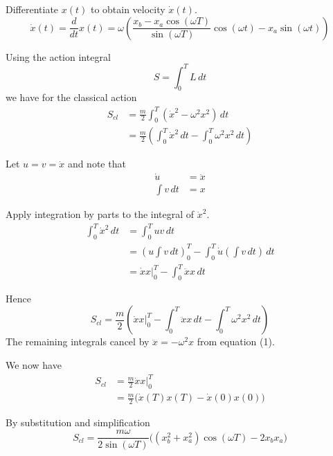 \documentclass[12pt]{article}
\begin{document}
Differentiate $x(t)$ to obtain velocity $\dot x(t)$.
\begin{equation*}
\dot x(t)=\frac{d}{dt}x(t)=
\omega\left(
\frac{x_b-x_a\cos(\omega T)}{\sin(\omega T)}\cos(\omega t)-x_a\sin(\omega t)
\right)
\tag{3}
\end{equation*}

Using the action integral
\begin{equation*}
S=\int_0^T L\,dt
\end{equation*}
we have for the classical action
\begin{align*}
S_{cl}&=\frac{m}{2}\int_0^T (\dot{x}^2-\omega^2 x^2)\,dt
\\[1ex]
&=\frac{m}{2}\left(
\int_0^T\dot{x}^2\,dt
-\int_0^T\omega^2x^2\,dt\right)
\end{align*}

Let $u=v=\dot x$ and note that
\begin{align*}
\dot u&=\ddot x
\\[1ex]
\int v\,dt&=x
\end{align*}

Apply integration by parts to the integral of $\dot x^2$.
\begin{align*}
\int_0^T \dot x^2\,dt
&=\int_0^T uv\,dt
\\[1ex]
&=\left(u\int v\,dt\right)_0^T
-\int_0^T\dot u\left(\int v\,dt\right)\,dt
\\[1ex]
&=\dot xx\bigg|_0^T-\int_0^T \ddot xx\,dt
\end{align*}

Hence
\begin{equation*}
S_{cl}=\frac{m}{2}\left(
\dot xx\bigg|_0^T-\int_0^T \ddot xx\,dt
-\int_0^T\omega^2x^2\,dt
\right)
\end{equation*}
The remaining integrals cancel by $\ddot x=-\omega^2x$ from equation (1).

\bigskip
We now have
\begin{align*}
S_{cl}&=\frac{m}{2}\dot xx\bigg|_0^T
\\[1ex]
&=\frac{m}{2}\bigg(\dot x(T)x(T)-\dot x(0)x(0)\bigg)
\tag{4}
\end{align*}

By substitution and simplification
\begin{equation*}
S_{cl}=\frac{m\omega}{2\sin(\omega T)}
\bigg((x_b^2+x_a^2)\cos(\omega T)-2x_b x_a\bigg)
\tag{5}
\end{equation*}
\end{document}
